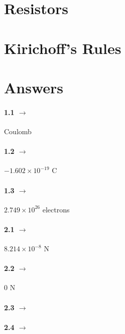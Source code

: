 \documentclass[11pt]{article}
\begin{document}

\pagebreak
\section{Resistors}


\pagebreak
\section{Kirichoff's Rules}



\pagebreak
\section{Answers}
\hspace{1cm}

\paragraph{1.1 $\rightarrow$} Coulomb
\paragraph{1.2 $\rightarrow$} $-1.602 \times 10^{-19}$ C
\paragraph{1.3 $\rightarrow$} $2.749 \times 10^{26}$ electrons

\paragraph{2.1 $\rightarrow$} $8.214 \times 10^{-8}$ N
\paragraph{2.2 $\rightarrow$} 0 N
\paragraph{2.3 $\rightarrow$} 
\paragraph{2.4 $\rightarrow$}
\end{document}
